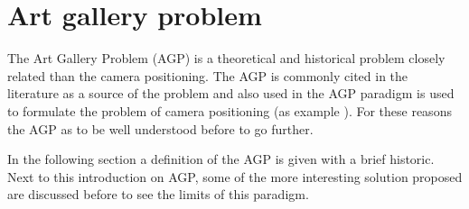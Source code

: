 \section{Art gallery problem} \label{sec:AGP}



The Art Gallery Problem (AGP) is a theoretical and historical problem closely related than the camera positioning. The AGP is commonly cited  in the literature as a source of the problem and also used in the AGP paradigm is used to formulate the problem of camera positioning (as example \citep{44*chvatal1975,53*packer2008,149*mavrinac2013}). For these reasons the AGP as to be well understood before to go further.


In the following section a definition of the AGP is given with a brief historic. Next to this introduction on AGP, some of the more interesting solution proposed are discussed before to see the limits of this paradigm.



